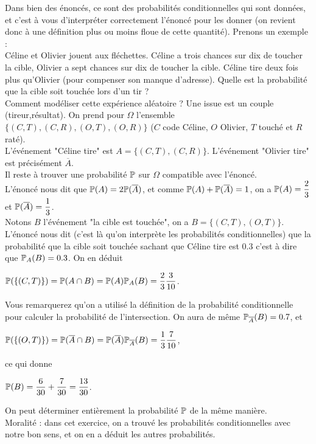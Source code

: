 \documentclass[12pt,a4paper]{report}
\begin{document}
\begin{remarque}[Avertissement]{}
Dans bien des énoncés, ce sont des probabilités conditionnelles qui sont données, et c'est à vous d'interpréter correctement l'énoncé pour les donner (on revient donc à une définition plus ou moins floue de cette quantité). Prenons un exemple : \\

Céline et Olivier jouent aux fléchettes. Céline a trois chances sur dix de toucher la cible, Olivier a sept chances sur dix de toucher la cible. Céline tire deux fois plus qu'Olivier (pour compenser son manque d'adresse). Quelle est la probabilité que la cible soit touchée lors d'un tir ? \\

Comment modéliser cette expérience aléatoire ? Une issue est un couple (tireur,résultat). On prend pour $\Omega$ l'ensemble $\{(C,T),(C,R),(O,T),(O,R)\}$ ($C$ code Céline, $O$ Olivier, $T$ touché et $R$ raté). \\
L'événement "Céline tire" est $A = \{(C,T),(C,R)\}$. L'événement "Olivier tire" est précisément $\overline{A}$. \\
Il reste à trouver une probabilité $\mathbb{P}$ sur $\Omega$ compatible avec l'énoncé. \\

L'énoncé nous dit que $\mathbb{P}(A) = 2\mathbb{P}(\overline{A})$, et comme $\mathbb{P}(A) + \mathbb{P}(\overline{A}) = 1$, on a $\mathbb{P}(A) = \dfrac{2}{3}$ et $\mathbb{P}(\overline{A}) = \dfrac{1}{3}$. \\

Notons $B$ l'événement "la cible est touchée", on a $B = \{(C,T),(O,T)\}$. L'énoncé nous dit (c'est là qu'on interprète les probabilités conditionnelles) que la probabilité que la cible soit touchée sachant que Céline tire est $0.3$ c'est à dire que $\mathbb{P}_A(B) = 0.3$. On en déduit
\begin{center}
$\mathbb{P}(\{(C,T)\}) = \mathbb{P}(A \cap B) = \mathbb{P}(A) \mathbb{P}_A(B) = \dfrac{2}{3} \dfrac{3}{10}$.
\end{center}

Vous remarquerez qu'on a utilisé la définition de la probabilité conditionnelle pour calculer la probabilité de l'intersection. On aura de même $\mathbb{P}_{\overline{A}}(B) = 0.7$, et 
\begin{center}
$\mathbb{P}(\{(O,T)\}) = \mathbb{P}(\overline{A} \cap B) = \mathbb{P}(\overline{A}) \mathbb{P}_{\overline{A}}(B) = \dfrac{1}{3}\dfrac{7}{10}$,
\end{center}
ce qui donne
\begin{center}
$\mathbb{P}(B) = \dfrac{6}{30}+\dfrac{7}{30} = \dfrac{13}{30}$.
\end{center}

On peut déterminer entièrement la probabilité $\mathbb{P}$ de la même manière. \\

Moralité : dans cet exercice, on a trouvé les probabilités conditionnelles avec notre bon sens, et on en a déduit les autres probabilités.
\end{remarque}
\end{document}

